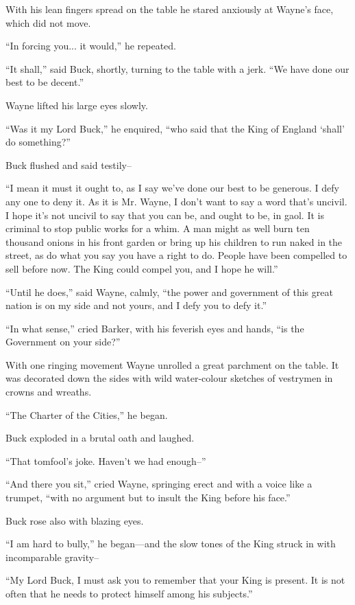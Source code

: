 \documentclass{book}
\begin{document}
With his lean fingers spread on the table he stared anxiously at Wayne’s face, which did not move.

“In forcing you... it would,” he repeated.

“It shall,” said Buck, shortly, turning to the table with a jerk. “We have done our best to be decent.”

Wayne lifted his large eyes slowly.

“Was it my Lord Buck,” he enquired, “who said that the King of England ‘shall’ do something?”

Buck flushed and said testily–

“I mean it must it ought to, as I say we’ve done our best to be generous. I defy any one to deny it. As it is Mr. Wayne, I don’t want to say a word that’s uncivil. I hope it’s not uncivil to say that you can be, and ought to be, in gaol. It is criminal to stop public works for a whim. A man might as well burn ten thousand onions in his front garden or bring up his children to run naked in the street, as do what you say you have a right to do. People have been compelled to sell before now. The King could compel you, and I hope he will.”

“Until he does,” said Wayne, calmly, “the power and government of this great nation is on my side and not yours, and I defy you to defy it.”

“In what sense,” cried Barker, with his feverish eyes and hands, “is the Government on your side?”

With one ringing movement Wayne unrolled a great parchment on the table. It was decorated down the sides with wild water-colour sketches of vestrymen in crowns and wreaths.

“The Charter of the Cities,” he began.

Buck exploded in a brutal oath and laughed.

“That tomfool’s joke. Haven’t we had enough–”

“And there you sit,” cried Wayne, springing erect and with a voice like a trumpet, “with no argument but to insult the King before his face.”

Buck rose also with blazing eyes.

“I am hard to bully,” he began—and the slow tones of the King struck in with incomparable gravity–

“My Lord Buck, I must ask you to remember that your King is present. It is not often that he needs to protect himself among his subjects.”
\end{document}
